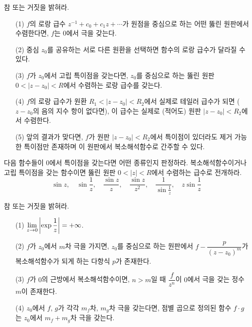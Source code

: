 \begin{salt_exercise}\label{ex-4-33}
참 또는 거짓을 밝혀라.
\begin{itemize}
\item[(1)] $f$의 로랑 급수 $z^{-1} + c_0 + c_1z + \cdots$가
원점을 중심으로 하는 어떤 뚫린 원판에서 수렴한다면, $f$는 $0$에서 극을 갖는다.
\item[(2)] 중심 $z_0$를 공유하는 서로 다른 원환을 선택하면 함수의 
로랑 급수가 달라질 수 있다.
\item[(3)] $f$가 $z_0$에서 고립 특이점을 갖는다면, 
$z_0$를 중심으로 하는 뚫린 원판 $0<|z-z_0|<R$에서 수렴하는 
로랑 급수를 갖는다.
\item[(4)] $f$의 로랑 급수가 원환 $R_1 <|z-z_0| <R_2$에서
실제로 테일러 급수가 되면 ($z-z_0$의 음의 지수 항이 없다면),
이 급수는 실제로 (적어도) 원판 $|z-z_0|<R_2$에서 수렴한다.
\item[(5)] 앞의 결과가 맞다면, $f$가 원판 $|z-z_0|<R_2$에서
특이점이 있더라도 제거 가능한 특이점만 존재하며 
이 원판에서 복소해석함수로 간주할 수 있다.
\end{itemize}
\end{salt_exercise}

\begin{salt_exercise}\label{ex-4-34}
다음 함수들이 $0$에서 특이점을 갖는다면 어떤 종류인지 판정하라.
복소해석함수이거나 고립 특이점을 갖는 함수이면
뚫린 원판 $0<|z|<R$에서 수렴하는 급수로 전개하라.
\[
\sin z, \quad \sin \dfrac1z,\quad \dfrac{\sin z}z,
\quad \dfrac{\sin z}{z^2}, \quad \dfrac1{\sin \frac1z},
\quad z\sin \dfrac1z
\]
\end{salt_exercise}

\begin{salt_exercise}\label{ex-4-35}
참 또는 거짓을 밝혀라.
\begin{itemize}
\item[(1)] $\lim\limits_{z\to 0} \left| \exp \displaystyle\frac1z \right| = +\infty$.
\item[(2)] $f$가 $z_0$에서 $m$차 극을 가지면, 
$z_0$를 중심으로 하는 원판에서
$f - \dfrac{p}{(z-z_0)^m}$가 복소해석함수가 되게 하는
다항식 $p$가 존재한다.
\item[(3)] $f$가 $0$의 근방에서 복소해석함수이면,
$n>m$일 때 $\dfrac f{z^n}$이 $0$에서 극을 갖는 정수 $m$이 존재한다.
\item[(4)] $z_0$에서 $f$, $g$가 각각 $m_f$차, $m_g$차 극을 갖는다면,
점별 곱으로 정의된 함수 $f\cdot g$는 $z_0$에서 $m_f+m_g$차 극을 갖는다.
\end{itemize}
\end{salt_exercise}

